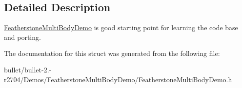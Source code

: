 \subsection{Detailed Description}
\hyperlink{class_featherstone_multi_body_demo}{Featherstone\+Multi\+Body\+Demo} is good starting point for learning the code base and porting. 

The documentation for this struct was generated from the following file\+:\begin{DoxyCompactItemize}
\item 
bullet/bullet-\/2.-\/r2704/\+Demos/\+Featherstone\+Multi\+Body\+Demo/Featherstone\+Multi\+Body\+Demo.\+h\end{DoxyCompactItemize}
